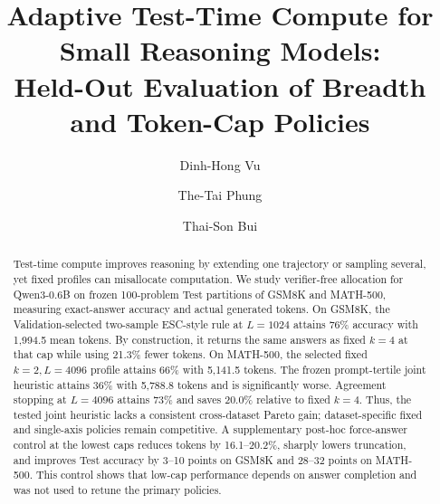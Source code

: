 \documentclass[runningheads]{llncs}
\begin{document}
\title{Adaptive Test-Time Compute for Small Reasoning Models:\\
Held-Out Evaluation of Breadth and Token-Cap Policies}

\author{Dinh-Hong Vu \and
The-Tai Phung \and
Thai-Son Bui}



\maketitle

\begin{abstract}
Test-time compute improves reasoning by extending one trajectory or sampling
several, yet fixed profiles can misallocate computation. We study verifier-free
allocation for Qwen3-0.6B on frozen 100-problem Test
partitions of GSM8K and MATH-500, measuring exact-answer accuracy and actual
generated tokens. On GSM8K, the Validation-selected two-sample ESC-style rule
at $L=1024$ attains 76\% accuracy with 1,994.5 mean tokens. By construction,
it returns the same answers as fixed $k=4$ at that cap while using 21.3\% fewer
tokens. On MATH-500, the selected fixed $k=2,L=4096$ profile attains 66\% with
5,141.5 tokens. The frozen prompt-tertile joint heuristic attains 36\% with
5,788.8 tokens and is significantly worse. Agreement stopping at $L=4096$
attains 73\% and saves 20.0\% relative to fixed $k=4$. Thus, the tested joint
heuristic lacks a consistent cross-dataset Pareto gain; dataset-specific fixed
and single-axis policies remain competitive. A
supplementary post-hoc force-answer control at the lowest caps reduces tokens
by 16.1--20.2\%, sharply lowers truncation, and improves Test accuracy by
3--10 points on GSM8K and 28--32 points on MATH-500. This control shows that
low-cap performance depends on answer completion and was not used to retune
the primary policies.

\end{abstract}
\end{document}
